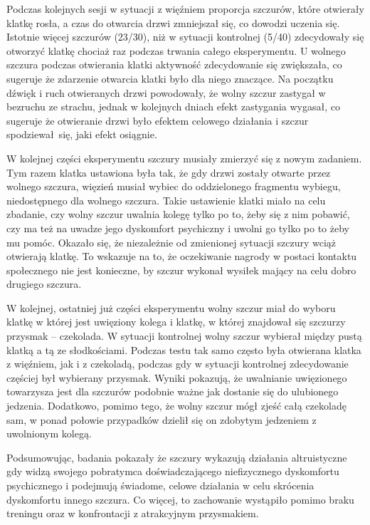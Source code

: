 \documentclass{psychol}
\begin{document}
Podczas kolejnych sesji w sytuacji z więźniem proporcja szczurów, które otwierały klatkę rosła, a czas do otwarcia drzwi zmniejszał się, co dowodzi uczenia się. Istotnie więcej szczurów (23/30), niż w sytuacji kontrolnej (5/40) zdecydowały się otworzyć klatkę chociaż raz podczas trwania całego eksperymentu. U wolnego szczura podczas otwierania klatki aktywność zdecydowanie się zwiększała, co sugeruje że zdarzenie otwarcia klatki było dla niego znaczące. Na początku dźwięk i ruch otwieranych drzwi powodowały, że wolny szczur zastygał w bezruchu ze strachu, jednak w kolejnych dniach efekt zastygania wygasał, co sugeruje że otwieranie drzwi było efektem celowego działania i szczur spodziewał się, jaki efekt osiągnie.

W kolejnej części eksperymentu szczury musiały zmierzyć się z nowym zadaniem. Tym razem klatka ustawiona była tak, że gdy drzwi zostały otwarte przez wolnego szczura, więzień musiał wybiec do oddzielonego fragmentu wybiegu, niedostępnego dla wolnego szczura. Takie ustawienie klatki miało na celu zbadanie, czy wolny szczur uwalnia kolegę tylko po to, żeby się z nim pobawić, czy ma też na uwadze jego dyskomfort psychiczny i uwolni go tylko po to żeby mu pomóc. Okazało się, że niezależnie od zmienionej sytuacji szczury wciąż otwierają klatkę. To wskazuje na to, że oczekiwanie nagrody w postaci kontaktu społecznego nie jest konieczne, by szczur wykonał wysiłek mający na celu dobro drugiego szczura.

W kolejnej, ostatniej już części eksperymentu wolny szczur miał do wyboru klatkę w której jest uwięziony kolega i klatkę, w której znajdował się szczurzy przysmak -- czekolada. W sytuacji kontrolnej wolny szczur wybierał między pustą klatką a tą ze słodkościami. Podczas testu tak samo często była otwierana klatka z więźniem, jak i z czekoladą, podczas gdy w sytuacji kontrolnej zdecydowanie częściej był wybierany przysmak. Wyniki pokazują, że uwalnianie uwięzionego towarzysza jest dla szczurów podobnie ważne jak dostanie się do ulubionego jedzenia. Dodatkowo, pomimo tego, że wolny szczur mógł zjeść całą czekoladę sam, w ponad połowie przypadków dzielił się on zdobytym jedzeniem z uwolnionym kolegą.

Podsumowując, badania pokazały że szczury wykazują działania altruistyczne gdy widzą swojego pobratymca doświadczającego niefizycznego dyskomfortu psychicznego i podejmują świadome, celowe działania w celu skrócenia dyskomfortu innego szczura. Co więcej, to zachowanie wystąpiło pomimo braku treningu oraz w konfrontacji z atrakcyjnym przysmakiem.
\end{document}
